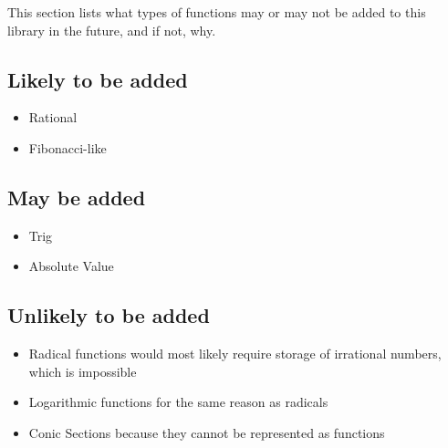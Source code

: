 \documentclass[12pt, letterpaper]{article}
\begin{document}
This section lists what types of functions may or may not be added
to this library in the future, and if not, why.

\subsection{Likely to be added}
\begin{itemize}
    \item Rational
    \item Fibonacci-like
\end{itemize}


\subsection{May be added}
\begin{itemize}
    \item Trig
    \item Absolute Value
\end{itemize}

\subsection{Unlikely to be added}
\begin{itemize}
    \item Radical functions would most likely require storage of 
        irrational numbers, which is impossible
    \item Logarithmic functions for the same reason as radicals
    \item Conic Sections because they cannot be represented as functions
\end{itemize}
\end{document}
